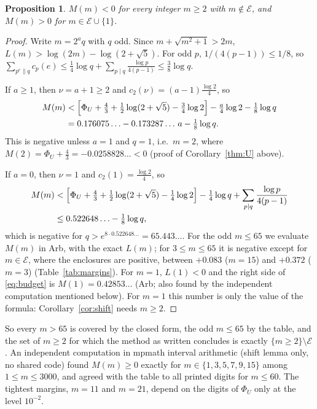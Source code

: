 \documentclass[11pt]{amsart}
\newtheorem{proposition}[theorem]{Proposition}
\theoremstyle{definition}
\theoremstyle{remark}
\numberwithin{equation}{section}
\newcommand{\cE}{\mathcal{E}}
\begin{document}
\begin{proposition}\label{prop:margins}
$M(m)<0$ for every integer $m\ge2$ with $m\notin\cE$, and $M(m)>0$ for $m\in\cE\cup\{1\}$.
\end{proposition}

\begin{proof}
Write $m=2^aq$ with $q$ odd. Since $m+\sqrt{m^2+1}>2m$, $L(m)>\log(2m)-\log(2+\sqrt5)$. For odd $p$,
$1/(4(p-1))\le1/8$, so $\sum_{p^e\parallel q}c_p(e)\le\frac14\log q+\sum_{p\mid q}\frac{\log p}{4(p-1)}\le\frac38\log q$.

If $a\ge1$, then $\nu=a+1\ge2$ and $c_2(\nu)=(a-1)\frac{\log2}4$, so
\begin{align*}
  M(m)&<\Bigl[\Phi_U+\tfrac43+\tfrac12\log(2+\sqrt5)-\tfrac34\log2\Bigr]-\tfrac a4\log2-\tfrac18\log q\\
  &=0.176075\ldots-0.173287\ldots\,a-\tfrac18\log q .
\end{align*}
This is negative unless $a=1$ and $q=1$, i.e.\ $m=2$, where $M(2)=\Phi_U+\frac43=-0.0258828\ldots<0$ (proof of
Corollary~\ref{thm:U} above).

If $a=0$, then $\nu=1$ and $c_2(1)=\frac{\log2}4$, so
\begin{align*}
  M(m)&<\Bigl[\Phi_U+\tfrac43+\tfrac12\log(2+\sqrt5)-\tfrac14\log2\Bigr]-\tfrac14\log q+\sum_{p\mid q}\frac{\log p}{4(p-1)}\\
  &\le0.522648\ldots-\tfrac18\log q,
\end{align*}
which is negative for $q>e^{8\cdot0.522648\ldots}=65.443\ldots$. For the odd $m\le65$ we evaluate $M(m)$ in Arb, with the
exact $L(m)$; for $3\le m\le65$ it is negative except for $m\in\cE$, where the enclosures are positive, between
$+0.083$ ($m=15$) and $+0.372$ ($m=3$) (Table~\ref{tab:margins}). For $m=1$, $L(1)<0$ and the right side of
\eqref{eq:budget} is $M(1)=0.42853\ldots$ (Arb; also found by the independent computation mentioned below). For $m=1$
this number is only the value of the formula: Corollary~\ref{cor:shift} needs $m\ge2$.
\end{proof}

So every $m>65$ is covered by the closed form, the odd $m\le65$ by the table, and the set of $m\ge2$ for which the
method as written concludes is exactly $\{m\ge2\}\setminus\cE$. An independent computation in mpmath interval arithmetic
(shift lemma only, no shared code) found $M(m)\ge0$ exactly for $m\in\{1,3,5,7,9,15\}$ among $1\le m\le3000$, and agreed
with the table to all printed digits for $m\le60$. The tightest margins, $m=11$ and $m=21$, depend on the digits of
$\Phi_U$ only at the level $10^{-2}$.
\end{document}
